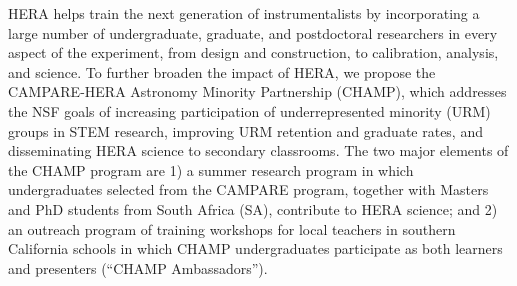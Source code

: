 \documentclass[preprint,11pt]{aastex}
\begin{document}
\noindent HERA helps train the next generation of instrumentalists
by incorporating a large number of undergraduate, graduate, and
postdoctoral researchers in every aspect of the experiment,
from design and construction, to calibration, analysis, and science. To
further broaden the impact of HERA, we propose the CAMPARE-HERA
Astronomy Minority Partnership (CHAMP), which addresses the NSF goals
of increasing participation of underrepresented minority (URM) groups
in STEM research, improving URM retention and graduate rates, and disseminating HERA science 
to secondary classrooms.
The two major elements of the CHAMP program are 1) 
a summer research program in which undergraduates selected from the CAMPARE program, together with Masters and PhD students from South Africa (SA), contribute to HERA science; and
2) an 
outreach program of training workshops for local teachers in southern California schools
in which CHAMP undergraduates participate as both learners and presenters (``CHAMP Ambassadors'').
\end{document}
